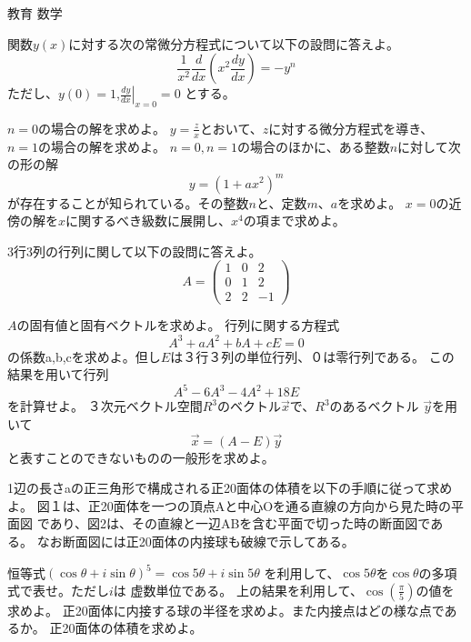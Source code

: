 \documentclass[fleqn]{jbook}
\begin{document}
\begin{question}{教育 数学}{}
\begin{subquestions}

\SubQuestion
 関数$y(x)$に対する次の常微分方程式について以下の設問に答えよ。
   \[\frac{1}{x^2}\frac{d}{dx}\left(x^2\frac{dy}{dx}\right)=-y^n\]
ただし、$y(0)=1$,$\displaystyle{
\left.\frac{dy}{dx}\right|_{x=0}=0}$ とする。
\begin{subsubquestions}
\SubSubQuestion
$n=0$の場合の解を求めよ。
\SubSubQuestion 
$y=\displaystyle{\frac{z}{x}}$とおいて、$z$に対する微分方程式を導き、
$n=1$の場合の解を求めよ。
\SubSubQuestion
$n=0,n=1$の場合のほかに、ある整数$n$に対して次の形の解
    \[y=(1+ax^2)^m\]
が存在することが知られている。その整数$n$と、定数$m、a$を求めよ。
\SubSubQuestion
$x=0$の近傍の解を$x$に関するべき級数に展開し、$x^4$の項まで求めよ。
\end{subsubquestions}

\SubQuestion
3行3列の行列に関して以下の設問に答えよ。
\[ A=\left(\begin{array}{rrr}
            1 & 0 & 2 \\
            0 & 1 & 2 \\
            2 & 2 & -1
          \end{array}\right)\]

\begin{subsubquestions}
\SubSubQuestion
$A$の固有値と固有ベクトルを求めよ。
\SubSubQuestion
行列に関する方程式
 \[A^3+aA^2+bA+cE=0 \]
の係数a,b,cを求めよ。但し$E$は３行３列の単位行列、$０$は零行列である。
この結果を用いて行列
   \[A^5-6A^3-4A^2+18E \]
を計算せよ。
\SubSubQuestion
 ３次元ベクトル空間$R^3$のベクトル$\vec{x}$で、$R^3$のあるベクトル
$\vec{y}$を用いて
 \[ \vec{x}=(A-E)\vec{y} \]
と表すことのできないものの一般形を求めよ。
\end{subsubquestions}

\SubQuestion
1辺の長さaの正三角形で構成される正20面体の体積を以下の手順に従って求めよ。
図１は、正20面体を一つの頂点Aと中心Oを通る直線の方向から見た時の平面図
であり、図2は、その直線と一辺ABを含む平面で切った時の断面図である。
なお断面図には正20面体の内接球も破線で示してある。
\begin{subsubquestions}
\SubSubQuestion
恒等式$(\cos\theta+{ i}\sin\theta)^5=\cos5\theta+{ i}\sin5\theta$
を利用して、$\cos5\theta$を$\cos\theta$の多項式で表せ。ただし$i$は
虚数単位である。
\SubSubQuestion
 上の結果を利用して、$\displaystyle{\cos\left(
\frac{\pi}{5}\right)}$の値を求めよ。
\SubSubQuestion
 正20面体に内接する球の半径を求めよ。また内接点はどの様な点であるか。
\SubSubQuestion
 正20面体の体積を求めよ。


\end{subsubquestions}
\end{subquestions}
\end{question}
\end{document}
